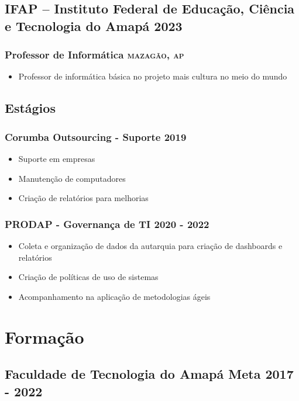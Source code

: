 \documentclass{article}
\newcommand{\rside}[1]{\hfill \normalfont\scshape\MakeLowercase{#1}}
\begin{document}
\subsection{IFAP – Instituto Federal de Educação, Ciência e Tecnologia do Amapá  \rside{2023}}
\subsubsection{ Professor de Informática  \rside{Mazagão, AP}}
\begin{itemize}
  \item Professor de informática básica no projeto mais cultura no meio do mundo
\end{itemize}

\subsection{Estágios}
\subsubsection{Corumba Outsourcing - Suporte \rside{2019}}
\begin{itemize}
  \item Suporte em empresas
  \item Manutenção de computadores
  \item Criação de relatórios para melhorias
\end{itemize}
\subsubsection{PRODAP - Governança de TI \rside{2020 - 2022}}
\begin{itemize}
  \item Coleta e organização de dados da autarquia para criação de dashboards e relatórios
  \item Criação de políticas de uso de sistemas
  \item Acompanhamento na aplicação de metodologias ágeis
\end{itemize}

\section{\faGraduationCap\enspace Formação}
\subsection{Faculdade de Tecnologia do Amapá Meta  \rside{2017 - 2022}}
\end{document}
